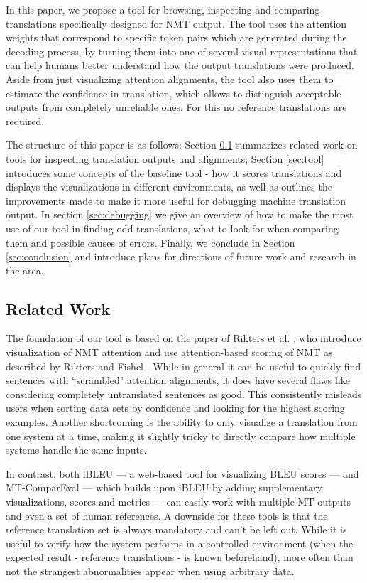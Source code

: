 \documentclass[runningheads,a4paper]{lncs/llncs}
\begin{document}
In this paper, we propose a tool for browsing, inspecting and comparing translations  specifically designed for NMT output. The tool uses the attention weights that correspond to
specific token pairs which are generated during the decoding process, by turning them into one of several visual representations that can help humans better understand how the
output translations were produced.
Aside from just visualizing attention alignments, the tool also uses them to estimate the confidence in translation, which allows to distinguish acceptable outputs from completely unreliable ones. For this no reference translations are required.

The structure of this paper is as follows: Section \ref{sec:related} summarizes related work on tools for inspecting translation outputs and alignments; Section \ref{sec:tool} introduces some concepts of the baseline tool - how it scores translations and displays the visualizations in different environments, as well as outlines the improvements made to make it more useful for debugging machine translation output. In section \ref{sec:debugging} we give an overview of how to make the most use of our tool in finding odd translations, what to look for when comparing them and possible causes of errors. Finally, we conclude in Section \ref{sec:conclusion} and introduce plans for directions of future work and research in the area.

\subsection{Related Work}
\label{sec:related}

The foundation of our tool is based on the paper of Rikters et al. \cite{rikters2017visualizing}, who introduce visualization of NMT attention and use attention-based scoring of NMT as described by Rikters and Fishel \cite{riktersfishel2017}. While in general it can be useful to quickly find sentences with ``scrambled" attention alignments, it does have several flaws like considering completely untranslated sentences as good. This consistently misleads users when sorting data sets by confidence and looking for the highest scoring examples. Another shortcoming is the ability to only visualize a translation from one system at a time, making it slightly tricky to directly compare how multiple systems handle the same inputs.

In contrast, both iBLEU \cite{madnani2011ibleu} --- a web-based tool for visualizing BLEU \cite{Papineni2002} scores --- and MT-ComparEval \cite{klejch2015mt} --- which builds upon iBLEU by adding supplementary visualizations, scores and metrics --- can easily work with multiple MT outputs and even a set of human references. A downside for these tools is that the reference translation set is always mandatory and can't be left out. While it is useful to verify how the system performs in a controlled environment (when the expected result - reference translations - is known beforehand), more often than not the strangest abnormalities appear when using arbitrary data.
\end{document}
